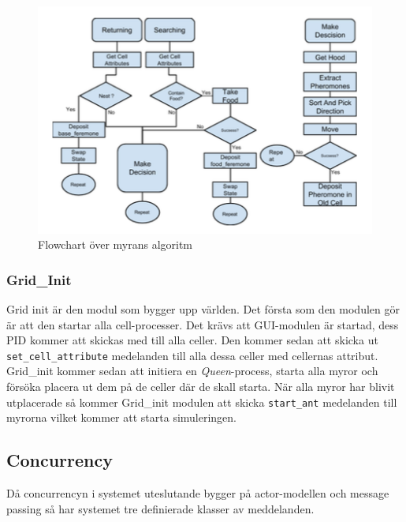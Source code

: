 \documentclass[12pt]{article}
\begin{document}
\begin{figure}[H]
    \centering
    \includegraphics[width=\textwidth]{BugsLife-Fig3.png}
    \caption{Flowchart över myrans algoritm}\label{fig:ant-algorithm}
\end{figure}

\subsubsection{Grid\_Init}
Grid init är den modul som bygger upp världen.
Det första som den modulen gör är att den startar alla cell-processer.
Det krävs att GUI-modulen är startad,
dess PID kommer att skickas med till alla celler.
Den kommer sedan att skicka ut \texttt{set\_cell\_attribute} medelanden till alla dessa celler med cellernas attribut.
Grid\_init kommer sedan att initiera en \textit{Queen}-process, starta alla myror och försöka placera ut dem på de celler där de skall starta.
När alla myror har blivit utplacerade så kommer Grid\_init modulen att skicka \texttt{start\_ant} medelanden till myrorna vilket kommer att starta simuleringen.

\subsection{Concurrency}
Då concurrencyn i systemet uteslutande bygger på actor-modellen och message passing så har systemet tre definierade klasser av meddelanden.
\end{document}
